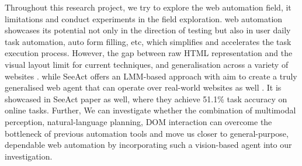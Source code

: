 Throughout this research project, we try to explore the web automation field, it limitations and conduct experiments in the field exploration. web automation showcases its potential not only in the direction of testing but also in user daily task automation, auto form filling, etc, which simplifies and accelerates the task execution process. However, the gap between raw HTML representation and the visual layout limit for current techniques, and generalisation across a variety of websites \cite{SeeAct}. while SeeAct offers an LMM-based approach with aim to create a truly generalised web agent that can operate over real-world websites as well \cite{SeeAct}. It is showcased in SeeAct \cite{SeeAct} paper as well, where they achieve 51.1\% task accuracy on online tasks. Further, We can investigate whether the combination of multimodal perception, natural-language planning, DOM interaction can overcome the bottleneck of previous automation tools and move us closer to general-purpose, dependable web automation by incorporating such a vision-based agent into our investigation.
